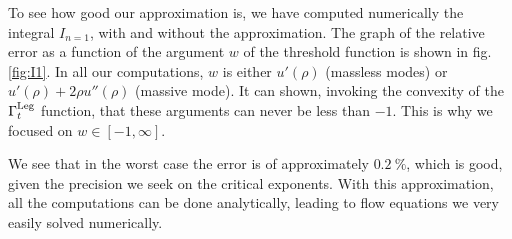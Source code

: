 To see how good our approximation is, we have computed numerically the integral $I_{n=1}$, with and without the approximation. The graph of the relative error as a function of the argument $w$ of the threshold function is shown in fig. \ref{fig:I1}. In all our computations, $w$ is either $u'(\rho)$ (massless modes) or $u'(\rho) + 2 \rho u''(\rho)$ (massive mode). It can shown, invoking the convexity of the $\Gamma_t^{\text{Leg}}$ function, that these arguments can never be less than $-1$. This is why we focused on $w \in [-1, \infty]$.

We see that in the worst case the error is of approximately $0.2~\%$, which is good, given the precision we seek on the critical exponents.
With this approximation, all the computations can be done analytically, leading to flow equations we very easily solved numerically.